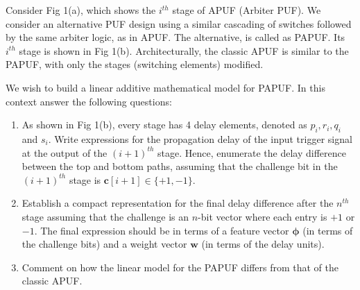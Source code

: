 \documentclass{article}
\begin{document}
\begin{questions}
\begin{enumerate}

\end{enumerate}

\question Consider Fig 1(a), which shows the $i^{th}$ stage 
of APUF (Arbiter PUF). We consider an 
alternative PUF design using a similar cascading of 
switches followed by the same arbiter logic, as in APUF. 
The alternative, is called as PAPUF. Its $i^{th}$ 
stage is shown in Fig 1(b). Architecturally, 
the classic APUF is similar to the PAPUF, with only the stages (switching elements) modified.

We wish to build a linear additive mathematical model for PAPUF. 
In this context answer the following questions:

\begin{enumerate}
\item 
As shown in Fig 1(b), every stage has 
4 delay elements, denoted as $p_i, r_i, q_i$ and 
$s_i$. Write expressions for the 
propagation delay of the input trigger signal 
at the output of the $(i+1)^{th}$ stage. 
Hence, enumerate the delay difference between the 
top and bottom paths, assuming that the challenge 
bit in the $(i+1)^{th}$ stage is 
$\mathrm{\mathbf {c}}[i+1] \in \{+1,-1\}$.


\item Establish a compact representation for 
the final delay difference after the $n^{th}$ stage 
assuming that the challenge is an $n$-bit vector 
where each entry is $+1$ or $-1$. 
The final expression should be in terms of a 
feature vector $\bm{\phi}$ (in terms 
of the challenge bits) and a weight vector 
$\mathrm{\mathbf{w}}$ (in terms of the delay units). 


\item Comment on how the linear model for the PAPUF 
differs from that of the classic APUF.



\end{enumerate}
\end{questions}
\end{document}
